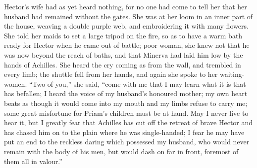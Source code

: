 Hector’s wife had as yet heard nothing, for no one had come to tell her
that her husband had remained without the gates. She was at her loom in an
inner part of the house, weaving a double purple web, and embroidering it
with many flowers. She told her maids to set a large tripod on the fire,
so as to have a warm bath ready for Hector when he came out of battle;
poor woman, she knew not that he was now beyond the reach of baths, and
that Minerva had laid him low by the hands of Achilles. She heard the cry
coming as from the wall, and trembled in every limb; the shuttle fell from
her hands, and again she spoke to her waiting-women. “Two of you,” she
said, “come with me that I may learn what it is that has befallen; I heard
the voice of my husband’s honoured mother; my own heart beats as though it
would come into my mouth and my limbs refuse to carry me; some great
misfortune for Priam’s children must be at hand. May I never live to hear
it, but I greatly fear that Achilles has cut off the retreat of brave
Hector and has chased him on to the plain where he was single-handed; I
fear he may have put an end to the reckless daring which possessed my
husband, who would never remain with the body of his men, but would dash
on far in front, foremost of them all in valour.”

